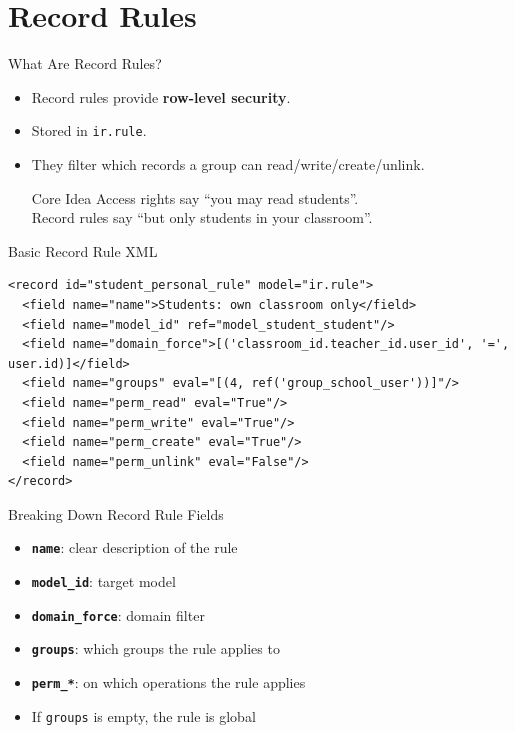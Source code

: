 \section{Record Rules}

\begin{frame}[fragile]{What Are Record Rules?}
	\begin{itemize}
		\item Record rules provide \textbf{row-level security}.
		\item Stored in \texttt{ir.rule}.
		\item They filter which records a group can read/write/create/unlink.
\begin{block}{Core Idea}
	Access rights say ``you may read students''.\\
	Record rules say ``but only students in your classroom''.
\end{block}
	\end{itemize}
\end{frame}

\begin{frame}[fragile]{Basic Record Rule XML}
\begin{lstlisting}[style=xml]
<record id="student_personal_rule" model="ir.rule">
  <field name="name">Students: own classroom only</field>
  <field name="model_id" ref="model_student_student"/>
  <field name="domain_force">[('classroom_id.teacher_id.user_id', '=', user.id)]</field>
  <field name="groups" eval="[(4, ref('group_school_user'))]"/>
  <field name="perm_read" eval="True"/>
  <field name="perm_write" eval="True"/>
  <field name="perm_create" eval="True"/>
  <field name="perm_unlink" eval="False"/>
</record>
\end{lstlisting}
\end{frame}

\begin{frame}[fragile]{Breaking Down Record Rule Fields}
	\begin{itemize}
		\item \textbf{\texttt{name}}: clear description of the rule
		\item \textbf{\texttt{model\_id}}: target model
		\item \textbf{\texttt{domain\_force}}: domain filter
		\item \textbf{\texttt{groups}}: which groups the rule applies to
		\item \textbf{\texttt{perm\_*}}: on which operations the rule applies
		\item If \texttt{groups} is empty, the rule is global
	\end{itemize}
\end{frame}

